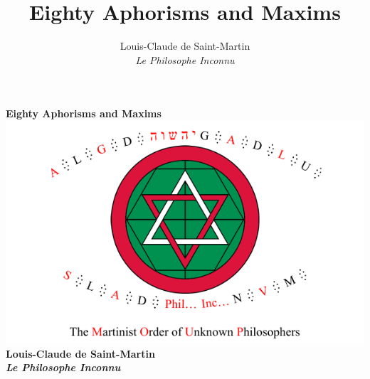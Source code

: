 \documentclass[b6paper,openany,11pt]{book}
\title{Eighty Aphorisms and Maxims}
\author{Louis-Claude de Saint-Martin\\\emph{Le Philosophe Inconnu}}
\date{}
\begin{document}
	\begin{titlepage}
		\centering
		\vspace*{\fill}
		{\bfseries\LARGE
			Eighty Aphorisms and Maxims\\
		}
		\vspace*{0.5in}
		\includegraphics[]{tikz/pantacle.pdf}\\
		\vspace*{0.5in}
		{\bfseries
			Louis-Claude de Saint-Martin\\
			\emph{Le Philosophe Inconnu}
		}   
		\vspace*{\fill}
	\end{titlepage}
	\restoregeometry
\end{document}
